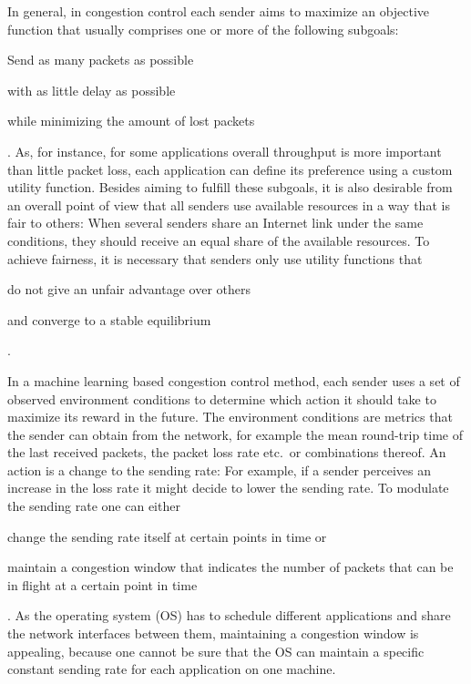 \documentclass[newfonts=false,format=sigconf,10pt,letterpaper]{acmart}
\begin{document}
In general, in congestion control each sender aims to maximize an objective function that usually comprises one or more of the following subgoals:
\begin{enumerate*}
\item Send as many packets as possible
\item with as little delay as possible
\item while minimizing the amount of lost packets
\end{enumerate*}. 
As, for instance, for some applications overall throughput is more important than little packet loss, each application can define its preference using a custom utility function. Besides aiming to fulfill these subgoals, it is also desirable from an overall point of view that all senders use available resources in a way that is fair to others: When several senders share an Internet link under the same conditions, they should receive an equal share of the available resources. To achieve fairness, it is necessary that senders only use utility functions that 
\begin{enumerate*}
\item do not give an unfair advantage over others
\item and converge to a stable equilibrium
\end{enumerate*}.

In a machine learning based congestion control method, each sender uses a set of observed environment conditions to determine which action it should take to maximize its reward in the future. The environment conditions are metrics that the sender can obtain from the network, for example the mean round-trip time of the last received packets, the packet loss rate etc.~or combinations thereof. An action is a change to the sending rate: For example, if a sender perceives an increase in the loss rate it might decide to lower the sending rate. To modulate the sending rate one can  either
\begin{enumerate*}
\item change the sending rate itself at certain points in time or
\item maintain a congestion window that indicates the number of packets that can be in flight at a certain point in time
\end{enumerate*}. As the operating system (OS) has to schedule different applications and share the network interfaces between them, maintaining a congestion window is appealing, because one cannot be sure that the OS can maintain a specific constant sending rate for each application on one machine. 
\end{document}
